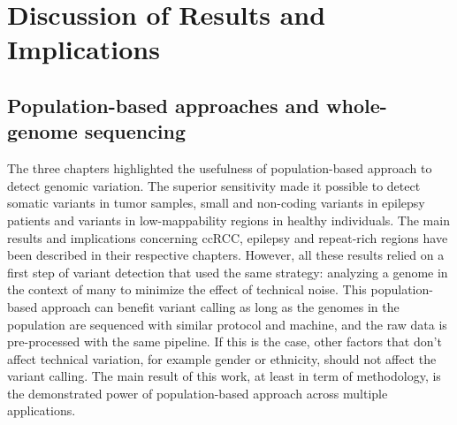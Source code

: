 \chapter{Discussion of Results and Implications}
\label{chap:disc}


\section*{Population-based approaches and whole-genome sequencing}
The three chapters highlighted the usefulness of population-based approach to detect genomic variation.
The superior sensitivity made it possible to detect somatic variants in tumor samples, small and non-coding variants in epilepsy patients and variants in low-mappability regions in healthy individuals.
The main results and implications concerning ccRCC, epilepsy and repeat-rich regions have been described in their respective chapters.
However, all these results relied on a first step of variant detection that used the same strategy: analyzing a genome in the context of many to minimize the effect of technical noise. 
This population-based approach can benefit variant calling as long as the genomes in the population are sequenced with similar protocol and machine, and the raw data is pre-processed with the same pipeline.
If this is the case, other factors that don't affect technical variation, for example gender or ethnicity, should not affect the variant calling.
The main result of this work, at least in term of methodology, is the demonstrated power of population-based approach across multiple applications.

